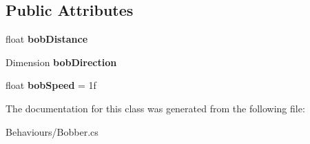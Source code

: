 \subsection*{Public Attributes}
\begin{DoxyCompactItemize}
\item 
\mbox{\label{class_stompy_blondie_1_1_behaviours_1_1_bobber_af19a43e9b4c27a9f051cb9a2752170b4}} 
float {\bfseries bob\+Distance}
\item 
\mbox{\label{class_stompy_blondie_1_1_behaviours_1_1_bobber_a09bd3f72a7af5f83f2c6f6cdd35aeefa}} 
Dimension {\bfseries bob\+Direction}
\item 
\mbox{\label{class_stompy_blondie_1_1_behaviours_1_1_bobber_a70dd7d7f45370459a859ee2c86d5cf9f}} 
float {\bfseries bob\+Speed} = 1f
\end{DoxyCompactItemize}


The documentation for this class was generated from the following file\+:\begin{DoxyCompactItemize}
\item 
Behaviours/Bobber.\+cs\end{DoxyCompactItemize}
